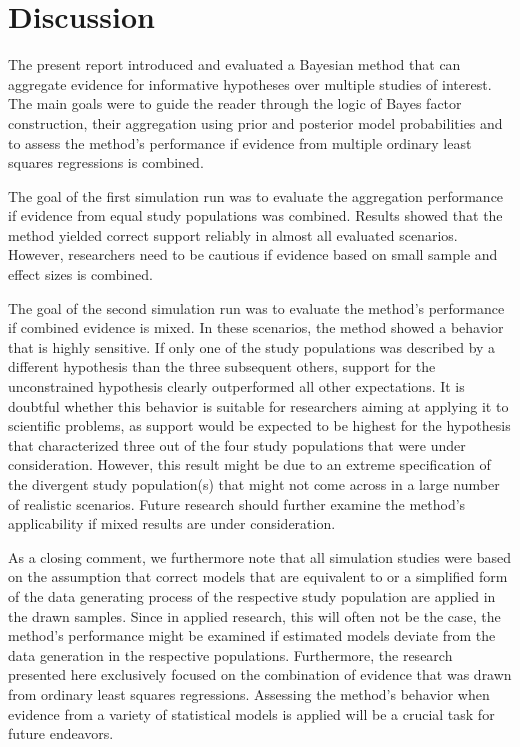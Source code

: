 \documentclass[11pt, a4paper]{article} %
\begin{document}
\section{Discussion}
\noindent The present report introduced and evaluated a Bayesian method that can aggregate evidence for informative hypotheses over multiple studies of interest. The main goals were to guide the reader through the logic of Bayes factor construction, their aggregation using prior and posterior model probabilities and to assess the method's performance if evidence from multiple ordinary least squares regressions is combined. 

The goal of the first simulation run was to evaluate the aggregation performance if evidence from equal study populations was combined. Results showed that the method yielded correct support reliably in almost all evaluated scenarios. However, researchers need to be cautious if evidence based on small sample and effect sizes is combined. 

The goal of the second simulation run was to evaluate the method's performance if combined evidence is mixed. In these scenarios, the method showed a behavior that is highly sensitive. If only one of the study populations was described by a different hypothesis than the three subsequent others, support for the unconstrained hypothesis clearly outperformed all other expectations. It is doubtful whether this behavior is suitable for researchers aiming at applying it to scientific problems, as support would be expected to be highest for the hypothesis that characterized three out of the four study populations that were under consideration. However, this result might be due to an extreme specification of the divergent study population(s) that might not come across in a large number of realistic scenarios. Future research should further examine the method's applicability if mixed results are under consideration. 

As a closing comment, we furthermore note that all simulation studies were based on the assumption that correct models that are equivalent to or a simplified form of the data generating process of the respective study population are applied in the drawn samples. Since in applied research, this will often not be the case, the method's performance might be examined if estimated models deviate from the data generation in the respective populations. Furthermore, the research presented here exclusively focused on the combination of evidence that was drawn from ordinary least squares regressions. Assessing the method's behavior when evidence from a variety of statistical models is applied will be a crucial task for future endeavors.    
 
 

\end{document}
